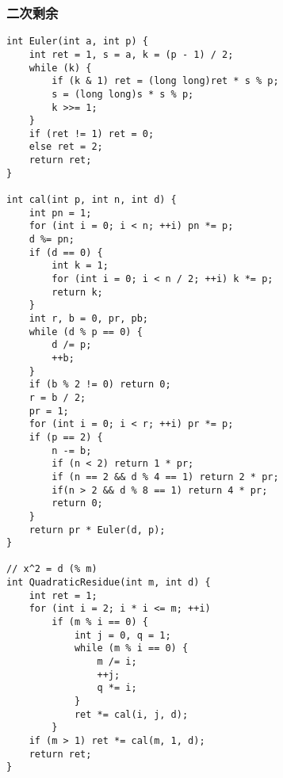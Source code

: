 \subsubsection{二次剩余}
\begin{verbatim}
int Euler(int a, int p) {
    int ret = 1, s = a, k = (p - 1) / 2;
    while (k) {
        if (k & 1) ret = (long long)ret * s % p;
        s = (long long)s * s % p;
        k >>= 1;
    }
    if (ret != 1) ret = 0;
    else ret = 2;
    return ret;
}        

int cal(int p, int n, int d) {
    int pn = 1;
    for (int i = 0; i < n; ++i) pn *= p;
    d %= pn;
    if (d == 0) {
        int k = 1;
        for (int i = 0; i < n / 2; ++i) k *= p;
        return k;
    }
    int r, b = 0, pr, pb;
    while (d % p == 0) {
        d /= p;
        ++b;
    }
    if (b % 2 != 0) return 0;
    r = b / 2;
    pr = 1;
    for (int i = 0; i < r; ++i) pr *= p;
    if (p == 2) {
        n -= b;
        if (n < 2) return 1 * pr;
        if (n == 2 && d % 4 == 1) return 2 * pr;
        if(n > 2 && d % 8 == 1) return 4 * pr;
        return 0;
    }
    return pr * Euler(d, p);
}

// x^2 = d (% m)
int QuadraticResidue(int m, int d) {
    int ret = 1;
    for (int i = 2; i * i <= m; ++i)
        if (m % i == 0) {
            int j = 0, q = 1;
            while (m % i == 0) {
                m /= i;
                ++j;
                q *= i;
            }
            ret *= cal(i, j, d);
        }
    if (m > 1) ret *= cal(m, 1, d);
    return ret;
}
\end{verbatim}
